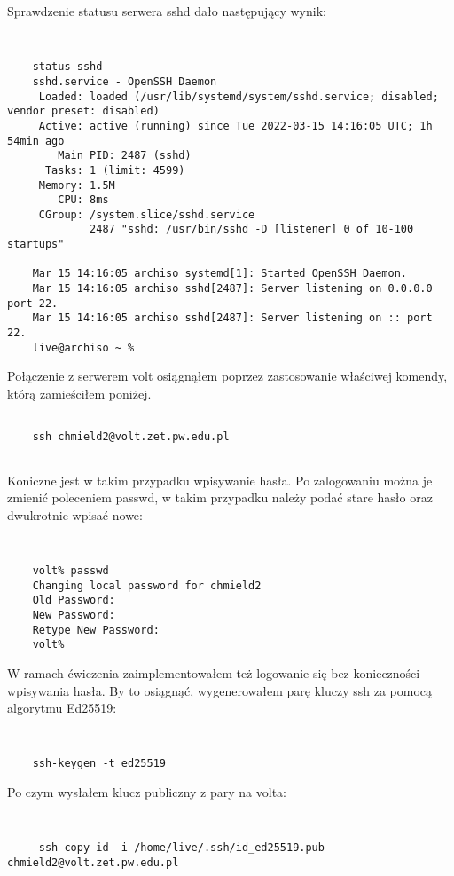 \documentclass[a4paper,11pt]{article}
\begin{document}
Sprawdzenie statusu serwera sshd dało następujący wynik:

{\tt
\begin{verbatim}
    status sshd
    sshd.service - OpenSSH Daemon
     Loaded: loaded (/usr/lib/systemd/system/sshd.service; disabled; vendor preset: disabled)
     Active: active (running) since Tue 2022-03-15 14:16:05 UTC; 1h 54min ago
        Main PID: 2487 (sshd)
      Tasks: 1 (limit: 4599)
     Memory: 1.5M
        CPU: 8ms
     CGroup: /system.slice/sshd.service
             2487 "sshd: /usr/bin/sshd -D [listener] 0 of 10-100 startups"

    Mar 15 14:16:05 archiso systemd[1]: Started OpenSSH Daemon.
    Mar 15 14:16:05 archiso sshd[2487]: Server listening on 0.0.0.0 port 22.
    Mar 15 14:16:05 archiso sshd[2487]: Server listening on :: port 22.
    live@archiso ~ % 

\end{verbatim}
}

Połączenie z serwerem volt osiągnąłem poprzez zastosowanie właściwej komendy, którą zamieściłem poniżej.

\begin{verbatim}

    ssh chmield2@volt.zet.pw.edu.pl
    
\end{verbatim}

Koniczne jest w takim przypadku wpisywanie hasła. Po zalogowaniu można je zmienić poleceniem passwd, w takim przypadku należy podać stare hasło oraz dwukrotnie wpisać nowe:

{\tt
\begin{verbatim}
    volt% passwd
    Changing local password for chmield2
    Old Password:
    New Password:
    Retype New Password:
    volt% 
\end{verbatim}
}

W ramach ćwiczenia zaimplementowałem też logowanie się bez konieczności wpisywania hasła. By to osiągnąć, wygenerowałem parę kluczy ssh za pomocą algorytmu Ed25519:

{\tt
\begin{verbatim}
    ssh-keygen -t ed25519
\end{verbatim}
}

Po czym wysłałem klucz publiczny z pary na volta:

{\tt
\begin{verbatim}
     ssh-copy-id -i /home/live/.ssh/id_ed25519.pub chmield2@volt.zet.pw.edu.pl
\end{verbatim}
}
\end{document}
